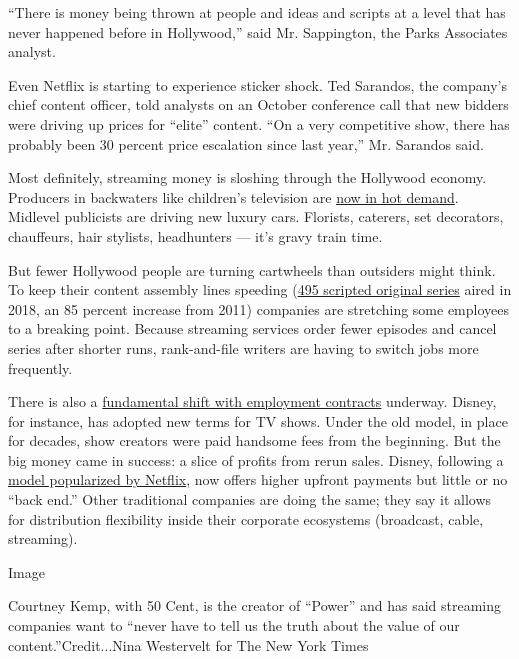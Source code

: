 ``There is money being thrown at people and ideas and scripts at a level
that has never happened before in Hollywood,'' said Mr. Sappington, the
Parks Associates analyst.

Even Netflix is starting to experience sticker shock. Ted Sarandos, the
company's chief content officer, told analysts on an October conference
call that new bidders were driving up prices for ``elite'' content. ``On
a very competitive show, there has probably been 30 percent price
escalation since last year,'' Mr. Sarandos said.

Most definitely, streaming money is sloshing through the Hollywood
economy. Producers in backwaters like children's television are
\href{https://www.nytimes3xbfgragh.onion/2019/10/11/business/media/netflix-children-movies-streaming.html}{now
in hot demand}. Midlevel publicists are driving new luxury cars.
Florists, caterers, set decorators, chauffeurs, hair stylists,
headhunters --- it's gravy train time.

But fewer Hollywood people are turning cartwheels than outsiders might
think. To keep their content assembly lines speeding
(\href{https://www.broadcastingcable.com/news/just-shy-of-500-scripted-originals-says-fx-survey}{495
scripted original series} aired in 2018, an 85 percent increase from
2011) companies are stretching some employees to a breaking point.
Because streaming services order fewer episodes and cancel series after
shorter runs, rank-and-file writers are having to switch jobs more
frequently.

There is also a
\href{https://deadline.com/2019/07/hollywood-profit-participation-tv-deals-changes-disney-streaming-services-1202641423/}{fundamental
shift with employment contracts} underway. Disney, for instance, has
adopted new terms for TV shows. Under the old model, in place for
decades, show creators were paid handsome fees from the beginning. But
the big money came in success: a slice of profits from rerun sales.
Disney, following a
\href{https://www.wsj.com/articles/the-war-for-talent-in-the-age-of-netflix-11569038435}{model
popularized by Netflix}, now offers higher upfront payments but little
or no ``back end.'' Other traditional companies are doing the same; they
say it allows for distribution flexibility inside their corporate
ecosystems (broadcast, cable, streaming).

Image

Courtney Kemp, with 50 Cent, is the creator of ``Power'' and has said
streaming companies want to ``never have to tell us the truth about the
value of our content.''Credit...Nina Westervelt for The New York Times

